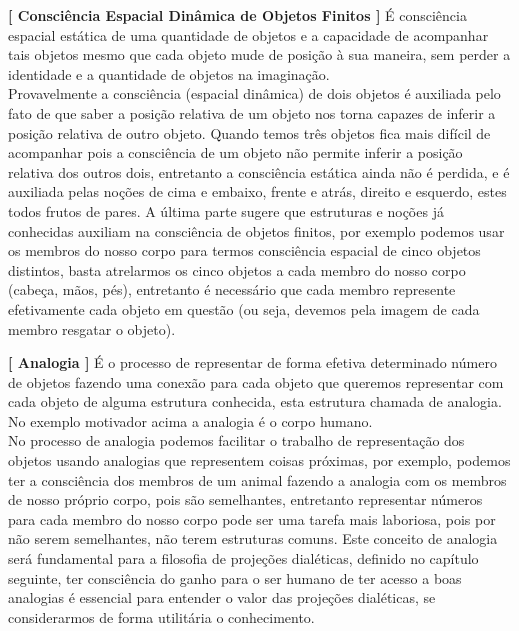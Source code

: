 \documentclass[10pt,a4paper]{report}
\begin{document}
\hspace{\baselineskip}

\textbf{[ Consciência Espacial Dinâmica de Objetos Finitos ]} É consciência espacial estática de uma quantidade de objetos e a capacidade de acompanhar tais objetos mesmo que cada objeto mude de posição à sua maneira, sem perder a identidade e a quantidade de objetos na imaginação.\\

Provavelmente a consciência (espacial dinâmica) de dois objetos é auxiliada pelo fato de que saber a posição relativa de um objeto nos torna capazes de inferir a posição relativa de outro objeto. Quando temos três objetos fica mais difícil de acompanhar pois a consciência de um objeto não permite inferir a posição relativa dos outros dois, entretanto a consciência estática ainda não é perdida, e é auxiliada pelas noções de cima e embaixo, frente e atrás, direito e esquerdo, estes todos frutos de pares. A última parte sugere que estruturas e noções já conhecidas auxiliam na consciência de objetos finitos, por exemplo podemos usar os membros do nosso corpo para termos consciência espacial de cinco objetos distintos, basta atrelarmos os cinco objetos a cada membro do nosso corpo (cabeça, mãos, pés), entretanto é necessário que cada membro represente efetivamente cada objeto em questão (ou seja, devemos pela imagem de cada membro resgatar o objeto).

\hspace{\baselineskip}

\textbf{[ Analogia ]} É o processo de representar de forma efetiva determinado número de objetos fazendo uma conexão para cada objeto que queremos representar com cada objeto de alguma estrutura conhecida, esta estrutura chamada de analogia. No exemplo motivador acima a analogia é o corpo humano. \\

No processo de analogia podemos facilitar o trabalho de representação dos objetos usando analogias que representem coisas próximas, por exemplo, podemos ter a consciência dos membros de um animal fazendo a analogia com os membros de nosso próprio corpo, pois são semelhantes, entretanto representar números para cada membro do nosso corpo pode ser uma tarefa mais laboriosa, pois por não serem semelhantes, não terem estruturas comuns. Este conceito de analogia será fundamental para a filosofia de projeções dialéticas, definido no capítulo seguinte, ter consciência do ganho para o ser humano de ter acesso a boas analogias é essencial para entender o valor das projeções dialéticas, se considerarmos de forma utilitária o conhecimento.
\end{document}
